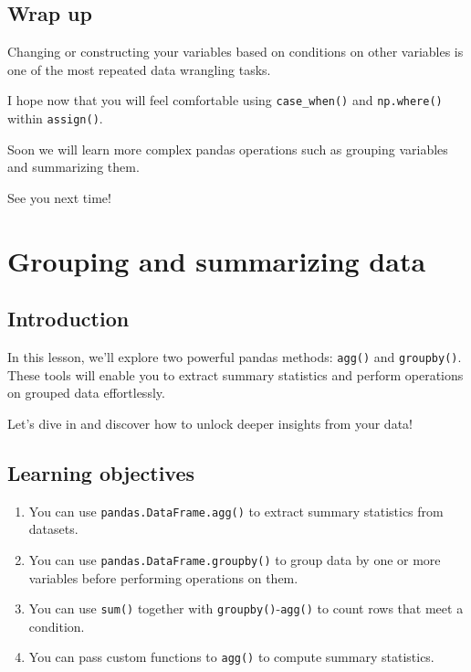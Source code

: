 \documentclass[
  letterpaper,
  DIV=11,
  numbers=noendperiod]{scrreprt}
\begin{document}
\section{Wrap up}\label{wrap-up-7}

Changing or constructing your variables based on conditions on other
variables is one of the most repeated data wrangling tasks.

I hope now that you will feel comfortable using \texttt{case\_when()}
and \texttt{np.where()} within \texttt{assign()}.

Soon we will learn more complex pandas operations such as grouping
variables and summarizing them.

See you next time!

\chapter{Grouping and summarizing
data}\label{grouping-and-summarizing-data}

\section{Introduction}\label{introduction-8}

In this lesson, we'll explore two powerful pandas methods:
\texttt{agg()} and \texttt{groupby()}. These tools will enable you to
extract summary statistics and perform operations on grouped data
effortlessly.

Let's dive in and discover how to unlock deeper insights from your data!

\section{Learning objectives}\label{learning-objectives-10}

\begin{enumerate}
\def\labelenumi{\arabic{enumi}.}
\item
  You can use \texttt{pandas.DataFrame.agg()} to extract summary
  statistics from datasets.
\item
  You can use \texttt{pandas.DataFrame.groupby()} to group data by one
  or more variables before performing operations on them.
\item
  You can use \texttt{sum()} together with
  \texttt{groupby()}-\texttt{agg()} to count rows that meet a condition.
\item
  You can pass custom functions to \texttt{agg()} to compute summary
  statistics.
\end{enumerate}
\end{document}
